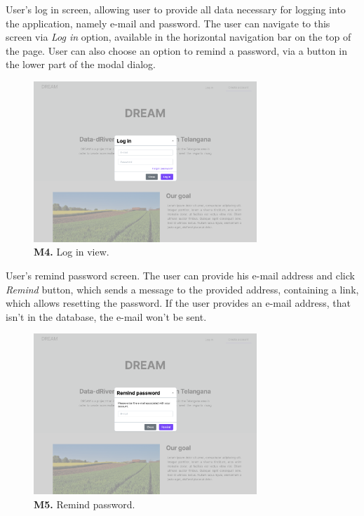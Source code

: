 User's log in screen, allowing user to provide all data necessary for logging into the application, namely e-mail and password. The user can navigate to this screen via \textit{Log in} option, available in the horizontal navigation bar on the top of the page. User can also choose an option to remind a password, via a button in the lower part of the modal dialog.
\begin{figure}[H]
    \centering
    \includegraphics[width=0.75\textwidth]{mockups/Unreg. user_Log in.png}
    \caption{\textbf{M4.} Log in view.}
    \label{fig:user-log-in}
\end{figure}

User's remind password screen. The user can provide his e-mail address and click \textit{Remind} button, which sends a message to the provided address, containing a link, which allows resetting the password. If the user provides an e-mail address, that isn't in the database, the e-mail won't be sent.
\begin{figure}[H]
    \centering
    \includegraphics[width=0.75\textwidth]{mockups/Unreg. user_Remind password.png}
    \caption{\textbf{M5.} Remind password.}
    \label{fig:user-remind-password}
\end{figure}


